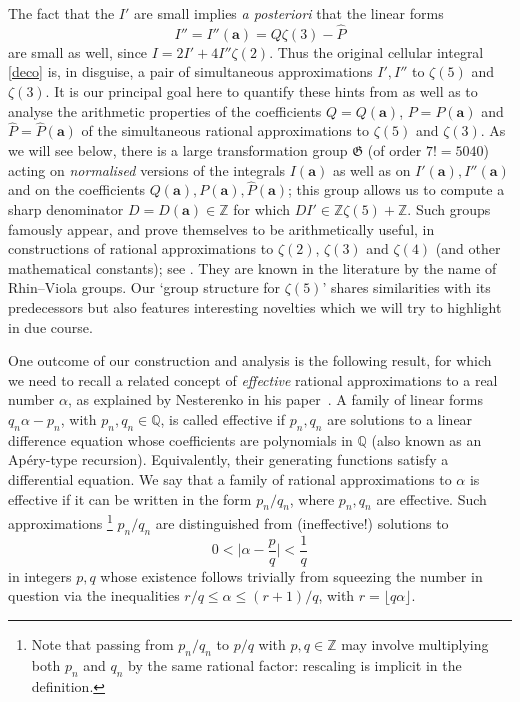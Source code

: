 \documentclass[12pt,reqno]{amsart}
\theoremstyle{remark}
\newcommand\ba{\boldsymbol a}
\newcommand\frG{\mathfrak G}
\newcommand\Z{\mathbb Z}
\begin{document}
The fact that the $I'$ are small  implies  \emph{a posteriori} that the linear forms
\[
I''=I''(\ba)=Q\zeta(3)-\hat P
\]
are small as well, since $I=2I'+4I''\zeta(2)$. Thus the original cellular integral \eqref{deco} is, in disguise, a pair of simultaneous approximations $I', I''$ to $\zeta(5)$ and $\zeta(3)$. 
It is our principal goal here to quantify these hints from \cite{Br16} as well as to analyse the arithmetic properties of the coefficients $Q=Q(\ba)$, $P=P(\ba)$ and $\hat P=\hat P(\ba)$ of the simultaneous rational approximations  to $\zeta(5)$ and $\zeta(3)$.
As we will see below, there is a large transformation group $\frG$ (of order $7!=5040$) acting on \emph{normalised} versions of the integrals $I(\ba)$ as well as on $I'(\ba),I''(\ba)$ and on the coefficients $Q(\ba),P(\ba),\hat P(\ba)$;
this group allows us to compute  a sharp  denominator  $D=D(\ba) \in \Z$ for which $DI'\in\mathbb Z\zeta(5)+\mathbb Z$.
Such groups famously appear,   and prove themselves to be arithmetically useful, in constructions of rational approximations to $\zeta(2)$, $\zeta(3)$ and $\zeta(4)$ (and other mathematical constants); see \cite{MZ20,RV96,RV01,VZ18,Zu04}.
They are known in the literature by the name of Rhin--Viola groups.
Our `group structure for $\zeta(5)$' shares similarities with its predecessors but also features interesting novelties which we will try to highlight in due course.


One outcome of our construction and analysis is the following result, for which we need to recall a related concept of \emph{effective} rational approximations to a real number $\alpha$, as explained by Nesterenko in his paper~\cite{Ne16}. A family of linear forms $q_n\alpha-p_n$, with $p_n, q_n \in \mathbb{Q}$, is called effective if $p_n,q_n$ are   solutions to a linear difference equation whose coefficients are polynomials in $\mathbb{Q}$  (also known as an Ap\'ery-type recursion). Equivalently, their generating functions satisfy a  differential equation.
We say that a family of rational approximations to $\alpha$ is effective if it can be written in the form $p_n/q_n$, where $p_n,q_n$ are effective. 
Such approximations%
\footnote{Note that passing from $p_n/q_n$ to $p/q$ with $p,q\in\mathbb Z$ may involve multiplying both $p_n$ and $q_n$ by the same rational factor:
rescaling is implicit in the definition.}
$p_n/q_n$ are distinguished from (ineffective!) solutions to
\[
0<\bigg|\alpha-\frac pq\bigg|<\frac1q
\]
in integers $p,q$ whose  existence follows trivially from  squeezing the number in question via the inequalities  $r/q\le\alpha\le(r+1)/q$, with $r=\lfloor q\alpha\rfloor$.
\end{document}
